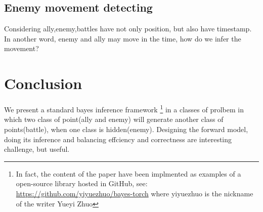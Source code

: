 \documentclass{article}
\begin{document}
\subsection{Enemy movement detecting}

Considering ally,enemy,battles have not only position, but also have timestamp. In another word,
enemy and ally may move in the time, how do we infer the movement?

\section{Conclusion}

We present a standard bayes inference framework 
\footnote{In fact, the content of the paper have been implmented as examples of a open-source library
hosted in GitHub, see: \url{https://github.com/yiyuezhuo/bayes-torch} where yiyuezhuo is the nickname of
the writer Yueyi Zhuo} 
in a classes of prolbem in which 
two class of point(ally and enemy) will generate another class of points(battle), 
when one class is hidden(enemy).
Designing the forward model, doing its inference and balancing effciency and correctness 
are interesting challenge, but useful.

 

\end{document}
